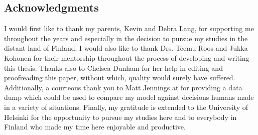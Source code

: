\begin{centering}

\section*{Acknowledgments}
\label{sec:thanks}

\end{centering}


I would first like to thank my parents, Kevin and Debra Lang,
for supporting me
throughout the years and especially in the decision to pursue my studies
in the distant land of Finland.
%
I would also
like to thank Drs. Teemu Roos
and Jukka Kohonen
for %
their mentorship throughout the
process of developing and writing this thesis.
%
Thanks also to Chelsea Dunham for her help in editing and proofreading
this paper,
without which,
quality would surely have suffered.
%
Additionally,
a courteous thank you to Matt Jennings at
 for providing a data dump
which could be used to compare my model against decisions humans made
in a variety of situations.
%
Finally, my gratitude is extended to the University of Helsinki for the
opportunity to pursue my studies here
and to everybody in Finland who made my time here enjoyable and productive.


\newpage
